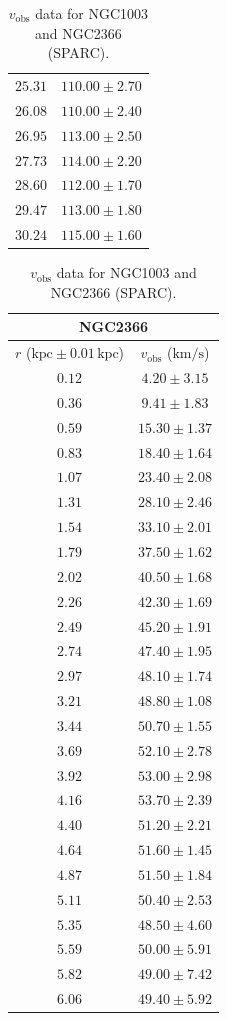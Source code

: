 \documentclass{article}
\newcommand\kpc{\textrm{kpc}}
\newcommand\kmps{\textrm{km}/\textrm{s}}
\newcommand\vobs{\ensuremath{v_{\textrm{obs}}}}
\begin{document}
\begin{table}[h!]
\begin{tabular}{|c|c|}
        $25.31$ & $110.00 \pm 2.70$ \\
        $26.08$ & $110.00 \pm 2.40$ \\
        $26.95$ & $113.00 \pm 2.50$ \\
        $27.73$ & $114.00 \pm 2.20$ \\
        $28.60$ & $112.00 \pm 1.70$ \\
        $29.47$ & $113.00 \pm 1.80$ \\
        $30.24$ & $115.00 \pm 1.60$ \\
        \hline
    \end{tabular}
    \hfill
    \begin{tabular}{|c|c|}
        \hline
        \multicolumn{2}{|c|}{NGC2366} \\
        \hline
        $r$ ($\kpc \pm 0.01 \,\kpc$) & $\vobs$ ($\kmps$) \\
        \hline
        $0.12$ & $4.20 \pm 3.15$ \\
        $0.36$ & $9.41 \pm 1.83$ \\
        $0.59$ & $15.30 \pm 1.37$ \\
        $0.83$ & $18.40 \pm 1.64$ \\
        $1.07$ & $23.40 \pm 2.08$ \\
        $1.31$ & $28.10 \pm 2.46$ \\
        $1.54$ & $33.10 \pm 2.01$ \\
        $1.79$ & $37.50 \pm 1.62$ \\
        $2.02$ & $40.50 \pm 1.68$ \\
        $2.26$ & $42.30 \pm 1.69$ \\
        $2.49$ & $45.20 \pm 1.91$ \\
        $2.74$ & $47.40 \pm 1.95$ \\
        $2.97$ & $48.10 \pm 1.74$ \\
        $3.21$ & $48.80 \pm 1.08$ \\
        $3.44$ & $50.70 \pm 1.55$ \\
        $3.69$ & $52.10 \pm 2.78$ \\
        $3.92$ & $53.00 \pm 2.98$ \\
        $4.16$ & $53.70 \pm 2.39$ \\
        $4.40$ & $51.20 \pm 2.21$ \\
        $4.64$ & $51.60 \pm 1.45$ \\
        $4.87$ & $51.50 \pm 1.84$ \\
        $5.11$ & $50.40 \pm 2.53$ \\
        $5.35$ & $48.50 \pm 4.60$ \\
        $5.59$ & $50.00 \pm 5.91$ \\
        $5.82$ & $49.00 \pm 7.42$ \\
        $6.06$ & $49.40 \pm 5.92$ \\
        \hline
    \end{tabular}
    \caption{$\vobs$ data for NGC1003 and NGC2366 (SPARC).}
    \label{tab:raw1003,2366}
\end{table}
\end{document}
